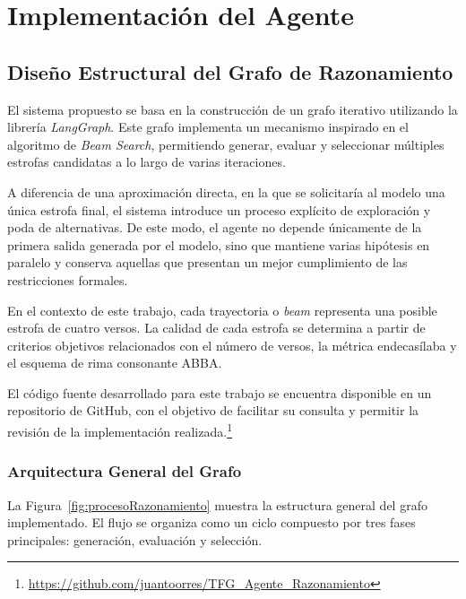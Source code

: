 \documentclass[12pt,a4paper,twoside,openright]{book}
\begin{document}

\chapter{Implementación del Agente}

\section{Diseño Estructural del Grafo de Razonamiento}

El sistema propuesto se basa en la construcción de un grafo iterativo utilizando la librería \emph{LangGraph}. Este grafo implementa un mecanismo inspirado en el algoritmo de \emph{Beam Search}, permitiendo generar, evaluar y
seleccionar múltiples estrofas candidatas a lo largo de varias iteraciones.

A diferencia de una aproximación directa, en la que se solicitaría al modelo una única estrofa final, el sistema introduce un proceso explícito de exploración y poda de alternativas. De este modo, el agente no depende únicamente
de la primera salida generada por el modelo, sino que mantiene varias hipótesis en paralelo y conserva aquellas que presentan un mejor cumplimiento de las restricciones formales.

En el contexto de este trabajo, cada trayectoria o \emph{beam} representa una posible estrofa de cuatro versos. La calidad de cada estrofa se determina a partir de criterios objetivos relacionados con el número de versos, la
métrica endecasílaba y el esquema de rima consonante ABBA.

El código fuente desarrollado para este trabajo se encuentra disponible en un repositorio de GitHub, con el objetivo de facilitar su consulta y permitir la revisión de la implementación realizada.\footnote{\url{https://github.com/juantoorres/TFG_Agente_Razonamiento}}

\subsection{Arquitectura General del Grafo}

La Figura~\ref{fig:procesoRazonamiento} muestra la estructura general del grafo implementado. El flujo se organiza como un ciclo compuesto por tres fases principales: generación, evaluación y selección.
\end{document}
